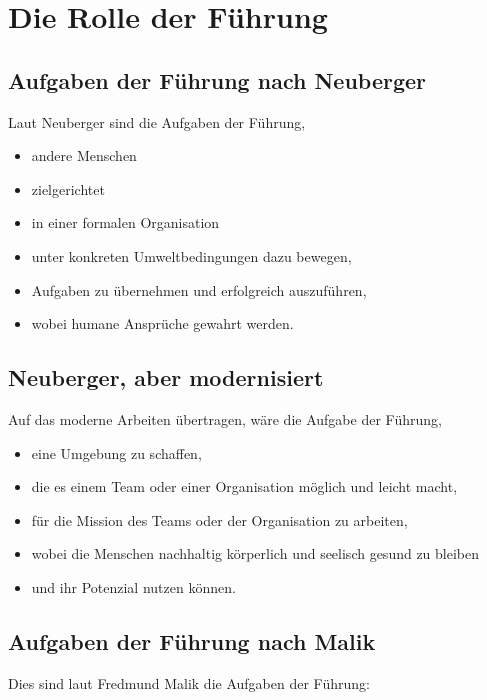 \section{Die Rolle der Führung}
\label{fuehrung-rolle}


\subsection{Aufgaben der Führung nach Neuberger}

Laut Neuberger\cite{neuberger-fuehren} sind die Aufgaben der Führung,

\begin{itemize}
  \item andere Menschen
  \item zielgerichtet
  \item in einer formalen Organisation
  \item unter konkreten Umweltbedingungen dazu bewegen,
  \item Aufgaben zu übernehmen und erfolgreich auszuführen,
  \item wobei humane Ansprüche gewahrt werden.
\end{itemize}


\subsection{Neuberger, aber modernisiert}

Auf das moderne Arbeiten übertragen, wäre die Aufgabe der Führung,

\begin{itemize}
  \item eine Umgebung zu schaffen,
  \item die es einem Team oder einer Organisation möglich und leicht macht,
  \item für die Mission des Teams oder der Organisation zu arbeiten,
  \item wobei die Menschen nachhaltig körperlich und seelisch gesund zu bleiben
  \item und ihr Potenzial nutzen können.
\end{itemize}


\subsection{Aufgaben der Führung nach Malik}

Dies sind laut Fredmund Malik \cite{malik-fuehrung} die Aufgaben der Führung:

